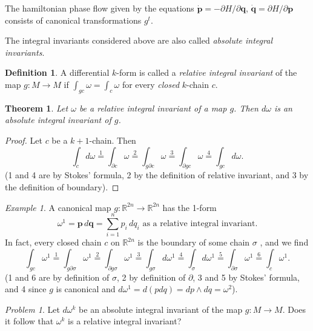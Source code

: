 \documentclass{book}
\numberwithin{equation}{section}
\theoremstyle{plain}
\newtheorem*{thm*}{Theorem}
\theoremstyle{definition}
\newtheorem*{defn*}{Definition}
\theoremstyle{remark}
\theoremstyle{remark}
\newtheorem*{ex*}{Example}
\newtheorem*{prob*}{Problem}
\begin{document}
The hamiltonian phase flow given by the equations
$\dot{\mathbf p} = -\partial H/\partial \mathbf q$,
$\dot{\mathbf q} = \partial H/\partial \mathbf p$
consists of canonical transformations $g^t$.

The integral invariants considered above are also called
\emph{absolute integral invariants}.

\begin{defn*}
  A differential $k$-form is called a
  \emph{relative integral invariant} of the map
  $g: M \rightarrow M$ if
  $\int_{gc} \omega = \int_c \omega$
  for every \emph{closed} $k$-chain $c$.
\end{defn*}

\begin{thm*}
  Let $\omega$ be a relative integral invariant of a map $g$.
  Then $d\omega$ is an absolute integral invariant of $g$.
\end{thm*}

\begin{proof}
  Let $c$ be a $k+1$-chain. Then
  $$
  \int_c d\omega \stackrel{1}{=}
  \int_{\partial c} \omega
  \stackrel{2}{=}
  \int_{g\partial c} \omega
  \stackrel{3}{=}
  \int_{\partial gc} \omega
  \stackrel{4}{=}
  \int_{gc} d\omega.
  $$
  (1 and 4 are by Stokes' formula,
  2 by the definition of relative invariant,
  and 3 by the definition of boundary).
\end{proof}


\begin{ex*}
  A canonical map $g:\mathbb R^{2n} \rightarrow \mathbb R^{2n}$
  has the 1-form
  $$
  \omega^1 = \mathbf p \, d\mathbf q = \sum_{i = 1}^n p_i \, dq_i
  \mbox{ as a relative integral invariant.}
  $$
  In fact, every closed chain $c$ on $\mathbb R^{2n}$
  is the boundary of some chain $\sigma$
  ,
  and we find
  $$
  \int_{gc} \omega^1
  \stackrel{1}{=}
  \int_{g\partial \sigma} \omega^1
  \stackrel{2}{=}
  \int_{\partial g\sigma} \omega^1
  \stackrel{3}{=}
  \int_{g\sigma} d\omega^1
  \stackrel{4}{=}
  \int_{\sigma} d\omega^1
  \stackrel{5}{=}
  \int_{\partial \sigma} \omega^1
  \stackrel{6}{=}
  \int_{c} \omega^1.
  $$
  (1 and 6 are by definition of $\sigma$,
  2 by definition of $\partial$,
  3 and 5 by Stokes' formula,
  and 4 since $g$ is canonical and
  $d\omega^1 = d(pdq) = dp \wedge dq = \omega^2$).
\end{ex*}


\begin{prob*}
  Let $d\omega^k$ be an absolute integral invariant of the map
  $g: M \rightarrow M$. Does it follow that $\omega^k$ is a
  relative integral invariant?
\end{prob*}
\end{document}
